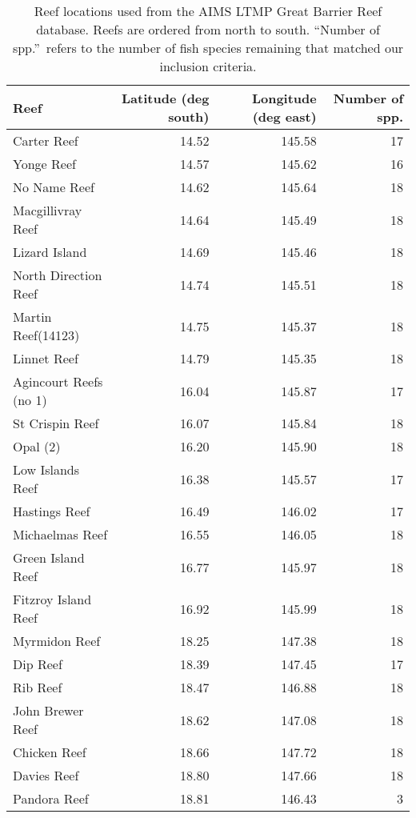 \begin{table}[ht]
\begin{center}
\caption[Reef locations used from the AIMS LTMP Great Barrier Reef database.]{Reef locations used from the AIMS LTMP Great Barrier Reef database.
  Reefs are ordered from north to south. ``Number of spp.''\ refers to the
  number of fish species remaining that matched our inclusion criteria.}
\label{tab:grb-meta}
{\footnotesize
\begin{tabular}{lrrr}
  \toprule
Reef & Latitude (deg south) & Longitude (deg east) & Number of spp. \\
  \midrule
Carter Reef & 14.52 & 145.58 & 17 \\
  Yonge Reef & 14.57 & 145.62 & 16 \\
  No Name Reef & 14.62 & 145.64 & 18 \\
  Macgillivray Reef & 14.64 & 145.49 & 18 \\
  Lizard Island & 14.69 & 145.46 & 18 \\
  North Direction Reef & 14.74 & 145.51 & 18 \\
  Martin Reef(14123) & 14.75 & 145.37 & 18 \\
  Linnet Reef & 14.79 & 145.35 & 18 \\
  Agincourt Reefs (no 1) & 16.04 & 145.87 & 17 \\
  St Crispin Reef & 16.07 & 145.84 & 18 \\
  Opal (2) & 16.20 & 145.90 & 18 \\
  Low Islands Reef & 16.38 & 145.57 & 17 \\
  Hastings Reef & 16.49 & 146.02 & 17 \\
  Michaelmas Reef & 16.55 & 146.05 & 18 \\
  Green Island Reef & 16.77 & 145.97 & 18 \\
  Fitzroy Island Reef & 16.92 & 145.99 & 18 \\
  Myrmidon Reef & 18.25 & 147.38 & 18 \\
  Dip Reef & 18.39 & 147.45 & 17 \\
  Rib Reef & 18.47 & 146.88 & 18 \\
  John Brewer Reef & 18.62 & 147.08 & 18 \\
  Chicken Reef & 18.66 & 147.72 & 18 \\
  Davies Reef & 18.80 & 147.66 & 18 \\
  Pandora Reef & 18.81 & 146.43 & 3 \\

\end{tabular}}
\end{center}
\end{table}
